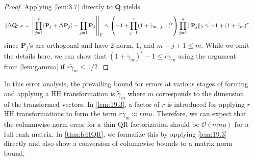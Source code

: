 \documentclass[review,onefignum,onetabnum]{siamart190516}
\newcommand{\bb}[1]{\mathbf{#1}}
\newcommand{\cO}{\mathcal{O}}
\begin{document}
\begin{proof}
	Applying \cref{lem:3.7} directly to $\bb{Q}$ yields
	\[\footnotesize
	\|\Delta\bb{Q}\|_F = \left|\left|\prod_{j=1}^r (\bb{P}_{j} + \Delta \bb{P}_{j})- \prod_{j=1}^r\bb{P}_{j} \right|\right|_F\leq\left(-1+\prod_{j-1}^r(1+\tilde{\gamma}_{m-j+1})^r\right)\prod_{j=1}^n\|\bb{P}_{j}\|_2 \leq -1+(1+\tilde{\gamma}_m)^r,\]
	since $\bb{P}_{j}$'s are orthogonal and have 2-norm, 1, and $m-j+1 \leq m$.
	While we omit the details here, we can show that $(1+\tilde{\gamma}_m)^r-1 \leq r\tilde{\gamma}_m$ using the argument from \cref{lem:gamma} if $r\tilde{\gamma}_m \leq 1/2$.
\end{proof}
In this error analysis, the prevailing bound for errors at various stages of forming and applying a HH transformation is $\tilde{\gamma}_{m}$ where $m$ corresponds to the dimension of the transformed vectors.
In \cref{lem:19.3}, a factor of $r$ is introduced for applying $r$ HH transformations to form the term $r\tilde{\gamma}_m \approx rmu$. 
Therefore, we can expect that the columnwise norm error for a thin QR factorization should be $\cO(mnu)$ for a full rank matrix. 
In \cref{thm:feHQR}, we formalize this by applying \cref{lem:19.3} directly and also show a conversion of columnwise bounds to a matrix norm bound,
\end{document}
